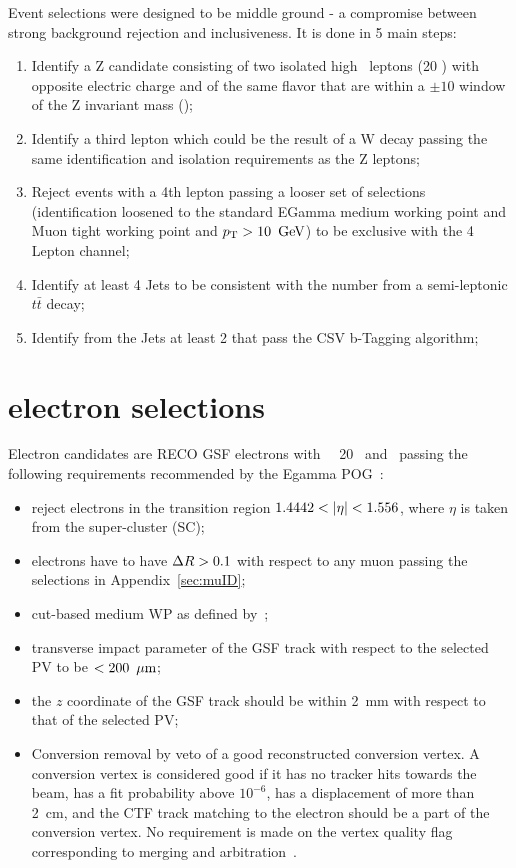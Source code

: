 Event selections were designed to be middle ground - a compromise between strong background rejection and inclusiveness. It is done in 5 main steps:
\begin{enumerate}
\item Identify a Z candidate consisting of two isolated high \pt \ leptons (20 \GeV ) with opposite electric charge and of the same flavor that are within a $\pm 10$ \GeV window of the Z invariant mass (\zmass);
\item Identify a third lepton which could be the result of a W decay passing the same identification and isolation requirements as the Z leptons;
\item Reject events with a 4th lepton passing a looser set of selections (identification loosened to the standard EGamma medium working point and Muon tight working point and $p_{\mathrm{T}} > 10 \ \,\text{Ge\hspace{-.08em}V}$) to be exclusive with the 4 Lepton channel;
\item Identify at least 4 Jets to be consistent with the number from a semi-leptonic $t\bar{t}$ decay;
\item Identify from the Jets at least 2 that pass the CSV b-Tagging algorithm;
\end{enumerate}	 
	 
\section{electron selections}
\label{sec:ElectronSelections}

Electron candidates are RECO GSF electrons with \pt\ \gt\ 20 \GeV\ and \absetaele\ passing the following requirements recommended by the Egamma POG~\cite{eleICHEP2012twiki}:
\begin{itemize}
\item reject electrons in the transition region $1.4442 < \left|\eta\right| < 1.556$, where $\eta$ is taken from the super-cluster (SC);
\item electrons have to have $\Delta R >0.1$ with respect to any muon passing the selections in Appendix~\ref{sec:muID};
\item cut-based medium WP as defined by~\cite{eleICHEP2012twiki};
\item transverse impact parameter of the GSF track with respect to the selected PV to be $<200~\,\mu\text{m}$;
\item the $z$ coordinate of the GSF track should be within 2~mm with respect to that of the selected PV;
\item Conversion removal by veto of a good reconstructed conversion vertex.  A conversion vertex is considered good if it has no tracker hits towards the beam, has a fit probability above $10^{-6}$, has a displacement of more than 2~cm, and the  CTF track matching to the electron should be a part of the conversion vertex. No requirement is made on the vertex quality flag corresponding to merging and arbitration~\cite{hwwsmurf}.
\end{itemize}

